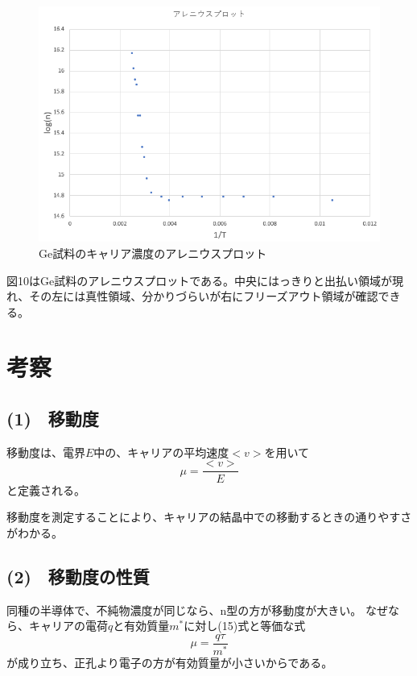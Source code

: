 \documentclass[dvipdfmx]{jsarticle}
\begin{document}
\begin{figure}[H]
\begin{center}
\includegraphics[scale = 1]{alenius.png}
\caption{Ge試料のキャリア濃度のアレニウスプロット}
\end{center}
\end{figure}

図10はGe試料のアレニウスプロットである。中央にはっきりと出払い領域が現れ、その左には真性領域、分かりづらいが右にフリーズアウト領域が確認できる。

\section{考察}
\subsection*{(1)　移動度}
移動度は、電界$E$中の、キャリアの平均速度$<v>$を用いて
\begin{equation}
\mu = \frac{<v>}{E}
\end{equation}
と定義される。

移動度を測定することにより、キャリアの結晶中での移動するときの通りやすさがわかる。
\subsection*{(2)　移動度の性質}
同種の半導体で、不純物濃度が同じなら、n型の方が移動度が大きい。
なぜなら、キャリアの電荷$q$と有効質量$m^{\ast}$に対し(15)式と等価な式
\begin{equation}
\mu = \frac{q\tau}{m^{\ast}}
\end{equation}が成り立ち、正孔より電子の方が有効質量が小さいからである。
\end{document}

